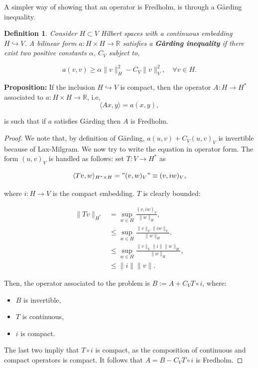 \documentclass{article}
\newtheorem{definition}{Definition}
\newcommand{\R}{\mathbb{R}}
\begin{document}
A simpler way of showing that an operator is Fredholm, is through a Gårding inequality.

\begin{definition}
    Consider $H\subset V$ Hilbert spaces with a continuous embedding $H\hookrightarrow V$. 
    A bilinear form $a:H\times H\to \R$ satisfies a \textbf{Gårding inequality} if there exist two positive constants $\alpha$, $C_V$ subject to, 
    
    \[a(v,v) \geq \alpha \|v\|^2_H - C_V\|v\|^2_V,\quad \forall v\in H.\]
\end{definition}

\textbf{Proposition:}
 If the inclusion $H\hookrightarrow V$ is compact, then the operator $A: H\to H^*$ associated to $a:H\times H\to \R$, i.e,
 \[\langle Ax,y\rangle = a(x,y),\]

 is such that if $a$ satisfies Gårding then $A$ is Fredholm. 

\begin{proof}
    We note that, by definition of Gårding,  \(a(u,v) + C_V(u,v)_V\) is invertible because of Lax-Milgram. 
    We now try to write the equation in operator form. The form $(u,v)_V$ is handled as follows: set $T:V\to H^*$ as

    \[\langle Tv, w\rangle_{H^*\times H} = "(v,w)_V"\equiv (v,iw)_V,\]

    where $i: H\to V$ is the compact embedding. $T$ is clearly bounded:

    \begin{align*}
        \|Tv\|_{H^*} &= \sup_{w\in H}\frac{(v,iw)_V}{\|w\|_H},\\
        &\leq \sup_{w\in H}\frac{\|v\|_V\|iw\|_V}{\|w\|_H},\\
        &\leq \sup_{w\in H}\frac{\|v\|_V\|i\|\|w\|_H}{\|w\|_H},\\
        &\leq \|i\|\|v\|.
    \end{align*}

    Then, the operator associated to the problem is $B :=A + C_V T\circ i$, where:
    \begin{itemize}
        \item $B$ is invertible,
        \item $T$ is continuous,
        \item $i$ is compact. 
    \end{itemize}

    The last two impliy that $T\circ i$ is compact, as the composition of continuous and compact operators is compact. 
    It follows that $A = B - C_V T\circ i$ is Fredholm.
\end{proof}
\end{document}
